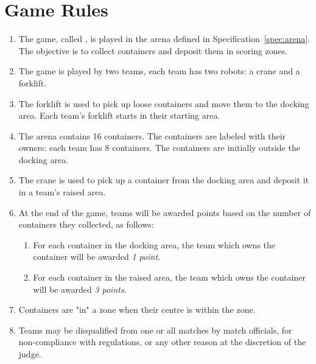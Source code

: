\section{Game Rules}
\label{sec:rules}

\begin{enumerate}
  \item The game, called \emph{\gamename}, is played in the arena defined in
        Specification~\ref{spec:arena}. The objective is to collect containers
        and deposit them in scoring zones.
  \item The game is played by two teams, each team has two robots: a crane and
        a forklift.
  \item The forklift is used to pick up loose containers and move them to the
        docking area. Each team's forklift starts in their starting area.
  \item The arena contains 16 containers. The containers are labeled with
        their owners: each team has 8 containers. The containers are
        initially outside the docking area.
  \item The crane is used to pick up a container from the docking area and
        deposit it in a team's raised area.
  \item At the end of the game, teams will be awarded points based on the
        number of containers they collected, as follows:
  \begin{enumerate}
    \item For each container in the docking area, the team which owns the
          container will be awarded \emph{1 point}.
    \item For each container in the raised area, the team which owns the
          container will be awarded \emph{3 points}.
  \end{enumerate}
  \item Containers are "in" a zone when their centre is within the zone.
  \item Teams may be disqualified from one or all matches by match officials,
        for non-compliance with regulations, or any other reason at the
        discretion of the judge.
\end{enumerate}
